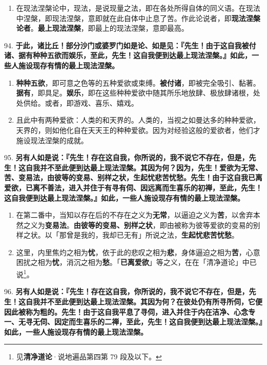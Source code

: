 \begin{enumerate}\item 在现法涅槃论中，现法，是说现量之法，即在各处所得自体的同义语。在现法中涅槃，即现法涅槃，意即就在此自体中止息了苦。作此论说者，即\textbf{现法涅槃论者}。\textbf{最上现法涅槃}，即最上的现法涅槃，意即最高。\end{enumerate}

{\Large 94.} \textbf{于此，诸比丘！部分沙门或婆罗门如是论、如是见：『先生！由于这自我被付诸、据有种种五欲而娱乐，至此，先生！这自我便到达最上现法涅槃。』如此，一些人施设现存有情的最上现法涅槃。}

\begin{enumerate}\item \textbf{种种五欲}，即可意之色等的五种爱欲或束缚。\textbf{被付诸}，即被完全吸引、黏著。\textbf{据有}，即具足。\textbf{娱乐}，即在这些种种爱欲中随其所乐地放肆、极放肆诸根，处处供给。或者，即游戏、喜乐、嬉戏。
\item 且此中有两种爱欲：人类的和天界的。人类的，当视之如曼达多的种种爱欲，天界的，则如他化自在天天王的种种爱欲。因为对经验这般的爱欲者，他们才施设现法涅槃的成就。\end{enumerate}

{\Large 95.} \textbf{另有人如是说：『先生！存在这自我，你所说的，我不说它不存在，但是，先生！这自我并不至此便到达最上现法涅槃。其因为何？因为，先生！爱欲为无常、苦、变易法，由彼等的变易、别样之状，生起忧悲苦忧愁。先生！由于这自我已离爱欲，已离不善法，进入并住于有寻有伺、因远离而生喜乐的初禅，至此，先生！这自我便到达最上现法涅槃。』如此，一些人施设现存有情的最上现法涅槃。}

\begin{enumerate}\item 在第二番中，当知以存在后的不存在之义为\textbf{无常}，以逼迫之义为\textbf{苦}，以舍弃本然之义为\textbf{变易法}。\textbf{由彼等的变易、别样之状}，即由被称为彼等爱欲的变易的别样之状。以「那曾是我的，我却已无有」所说之法，\textbf{生起忧悲苦忧愁}。
\item 这里，内里焦灼之相为\textbf{忧}，依于此的悲叹之相为\textbf{悲}，身体逼迫之相为\textbf{苦}，心意困扰之相为\textbf{忧}，消沉之相为\textbf{愁}。「\textbf{已离爱欲}」等之义，在在「清净道论」中已说\footnote{见\textbf{清净道论}·说地遍品第四第 79 段及以下。}。\end{enumerate}

{\Large 96.} \textbf{另有人如是说：『先生！存在这自我，你所说的，我不说它不存在，但是，先生！这自我并不至此便到达最上现法涅槃。其因为何？在彼处仍有所寻所伺，它便因此被称为粗的。先生！由于这自我平息了寻伺，进入并住于内在洁净、心念专一、无寻无伺、因定而生喜乐的二禅，至此，先生！这自我便到达最上现法涅槃。』如此，一些人施设现存有情的最上现法涅槃。}

